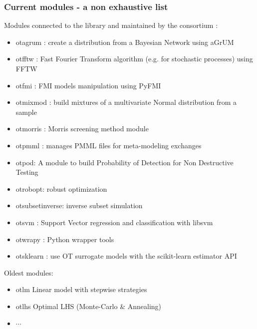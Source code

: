 \documentclass[8pt]{beamer}
\begin{document}
\begin{frame}[containsverbatim]
  \frametitle{Current modules - a non exhaustive list}
  
  \alert{Modules} connected to the library and maintained by the consortium :
  \begin{itemize}
  \item \alert{otagrum} : create a distribution from a Bayesian Network using aGrUM
  \item \alert{otfftw} : Fast Fourier Transform algorithm (e.g. for stochastic processes) using FFTW
  \item \alert{otfmi} : FMI models manipulation using PyFMI
  \item \alert{otmixmod} : build mixtures of a multivariate Normal distribution from a sample
  \item \alert{otmorris} : Morris screening method module
  \item \alert{otpmml} : manages PMML files for meta-modeling exchanges
  \item \alert{otpod}: A module to build Probability of Detection for Non Destructive Testing
  \item \alert{otrobopt}: robust optimization
  \item \alert{otsubsetinverse}: inverse subset simulation
  \item \alert{otsvm} : Support Vector regression and classification with libsvm
  \item \alert{otwrapy} : Python wrapper tools
  \item \alert{otsklearn} : use OT surrogate models with the scikit-learn estimator API
  \end{itemize}
  
  Oldest modules:
  \begin{itemize}
  \item \alert{otlm} Linear model with stepwise strategies
  \item \alert{otlhs} Optimal LHS (Monte-Carlo \& Annealing)
  \item $\cdots$
  \end{itemize}
  \end{frame}
  
\end{document}
